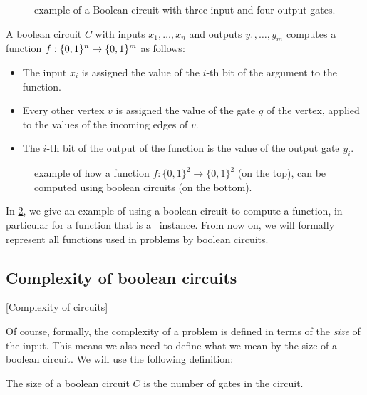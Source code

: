 \begin{figure}
	\centering
	\caption[Example of a Boolean Circuit]{example of a Boolean circuit with three input and four output gates.}
	\label{fig:boolean_circuit_example}
\end{figure}

\begin{definition}
	A boolean circuit $C$ with inputs $x_1, \dots, x_n$ and outputs $y_1, \dots, y_m$ computes a function $f : \{0, 1\}^n \rightarrow \{0, 1\}^m$ as follows:
	\begin{itemize}
		\item The input $x_i$ is assigned the value of the $i$-th bit of the argument to the function.
		\item Every other vertex $v$ is assigned the value of the gate $g$ of the vertex, applied to the values of the incoming edges of $v$.
		\item The $i$-th bit of the output of the function is the value of the output gate $y_i$.
	\end{itemize}
\end{definition}

\begin{figure}
	\centering
	\caption[Computing a function with circuits]{example of how a function $f : \{0, 1\}^2 \rightarrow \{0, 1\}^2$ (on the top), can be computed using boolean circuits (on the bottom).}
	\label{fig:computing_function_example}
\end{figure}

In \cref{fig:computing_function_example}, we give an example of using a boolean circuit to compute a function, in particular for a function that is a \Tarski\ instance. From now on, we will formally represent all functions used in problems by boolean circuits.

\subsection{Complexity of boolean circuits}[Complexity of circuits]

Of course, formally, the complexity of a problem is defined in terms of the \emph{size} of the input. This means we also need to define what we mean by the size of a boolean circuit. We will use the following definition:

\begin{definition}
	The size of a boolean circuit $C$ is the number of gates in the circuit.
\end{definition}

